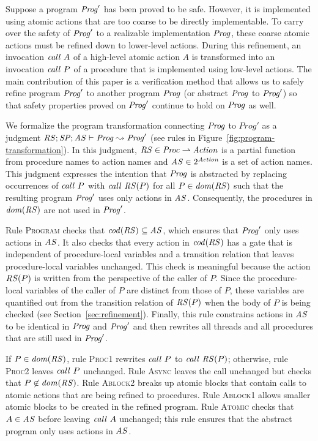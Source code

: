 Suppose a program $\mathit{Prog}'$ has been proved to be safe.
However, it is implemented using atomic actions that are too coarse to be directly implementable.  
To carry over the safety of $\mathit{Prog}'$ to a realizable implementation $\mathit{Prog}$, 
these coarse atomic actions must be refined down to lower-level actions.
During this refinement, an invocation $\mathit{call}\ A$ of a high-level atomic action $A$ is transformed into an 
invocation $\mathit{call}\ P$ of a procedure that is implemented using low-level actions.
The main contribution of this paper is a verification method that allows us to safely refine
program $\mathit{Prog}'$ to another program $\mathit{Prog}$ (or abstract $\mathit{Prog}$ to $\mathit{Prog}'$) so that 
safety properties proved on $\mathit{Prog}'$ continue to hold on $\mathit{Prog}$ as well.

We formalize the program transformation connecting $\mathit{Prog}$ to $Prog'$ as a judgment
$\mathit{RS};\mathit{SP};\mathit{AS} \vdash \mathit{Prog} \leadsto \mathit{Prog}'$ (see rules in Figure~\ref{fig:program-transformation}).
In this judgment,
$\mathit{RS} \in \mathit{Proc} \rightharpoonup \mathit{Action}$ is a partial function from procedure names to action names
and $\mathit{AS} \in 2^{\mathit{Action}}$ is a set of action names.
This judgment expresses the intention that $\mathit{Prog}$ is abstracted by replacing
occurrences of $\mathit{call}\ P$ with $\mathit{call}\ \mathit{RS}(P)$ for all $P \in \mathit{dom}(\mathit{RS})$ such that 
the resulting program $\mathit{Prog}'$ uses only actions in $\mathit{AS}$.
Consequently, the procedures in $\mathit{dom}(\mathit{RS})$ are not used in $\mathit{Prog}'$.

Rule \textsc{Program} checks that $\mathit{cod}(\mathit{RS}) \subseteq \mathit{AS}$,
which ensures that $\mathit{Prog}'$ only uses actions in $\mathit{AS}$.
It also checks that every action in $\mathit{cod}(\mathit{RS})$ has a gate 
that is independent of procedure-local variables and a transition relation that leaves 
procedure-local variables unchanged.  
This check is meaningful because the action $\mathit{RS}(P)$ is written from the 
perspective of the caller of $P$.
Since the procedure-local variables of the caller of $P$ are distinct from those of $P$,
these variables are quantified out from the transition relation of $\mathit{RS}(P)$ when 
the body of $P$ is being checked (see Section~\ref{sec:refinement}).
Finally, this rule constrains actions in $\mathit{AS}$ to be identical in $\mathit{Prog}$ and $\mathit{Prog}'$ and then rewrites all threads
and all procedures that are still used in $\mathit{Prog}'$.

If $P \in \mathit{dom}(\mathit{RS})$, rule \textsc{Proc1} rewrites $\mathit{call}\ P$ to $\mathit{call}\ \mathit{RS}(P)$;
otherwise, rule \textsc{Proc2} leaves $\mathit{call}\ P$ unchanged.
Rule \textsc{Async} leaves the call unchanged but checks that $P \not \in \mathit{dom}(\mathit{RS})$.
Rule \textsc{Ablock2} breaks up atomic blocks that contain calls
to atomic actions that are being refined to procedures.
Rule \textsc{Ablock1} allows smaller atomic blocks to be created in the refined program.
Rule \textsc{Atomic} checks that $A \in \mathit{AS}$ before leaving $\mathit{call}\ A$ unchanged;
this rule ensures that the abstract program only uses actions in $\mathit{AS}$.

